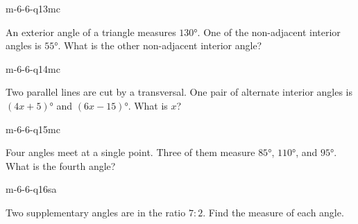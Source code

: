 \begin{practiceQuestion}{m-6-6-q13}{mc}
\begin{questionText}
An exterior angle of a triangle measures $130°$. One of the non-adjacent interior angles is $55°$. What is the other non-adjacent interior angle?
\end{questionText}
\end{practiceQuestion}

\begin{practiceQuestion}{m-6-6-q14}{mc}
\begin{questionText}
Two parallel lines are cut by a transversal. One pair of alternate interior angles is $(4x + 5)°$ and $(6x - 15)°$. What is $x$?
\end{questionText}
\end{practiceQuestion}

\begin{practiceQuestion}{m-6-6-q15}{mc}
\begin{questionText}
Four angles meet at a single point. Three of them measure $85°$, $110°$, and $95°$. What is the fourth angle?
\end{questionText}
\end{practiceQuestion}


\begin{practiceQuestion}{m-6-6-q16}{sa}
\begin{questionText}
Two supplementary angles are in the ratio $7:2$. Find the measure of each angle.
\end{questionText}
\end{practiceQuestion}

